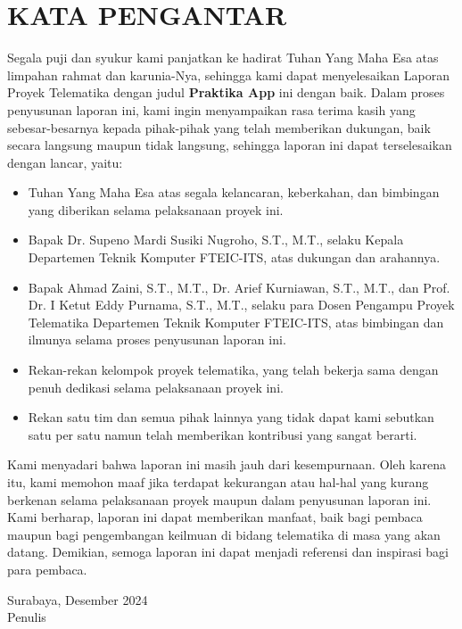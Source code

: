 \chapter*{KATA PENGANTAR}

Segala puji dan syukur kami panjatkan ke hadirat Tuhan Yang Maha Esa atas limpahan rahmat dan karunia-Nya, sehingga kami dapat menyelesaikan Laporan Proyek Telematika dengan judul \textbf{Praktika App} ini dengan baik. Dalam proses penyusunan laporan ini, kami ingin menyampaikan rasa terima kasih yang sebesar-besarnya kepada pihak-pihak yang telah memberikan dukungan, baik secara langsung maupun tidak langsung, sehingga laporan ini dapat terselesaikan dengan lancar, yaitu:

\begin{itemize}[leftmargin=2cm]
    \item Tuhan Yang Maha Esa atas segala kelancaran, keberkahan, dan bimbingan yang diberikan selama pelaksanaan proyek ini.
    \item Bapak Dr. Supeno Mardi Susiki Nugroho, S.T., M.T., selaku Kepala Departemen Teknik Komputer FTEIC-ITS, atas dukungan dan arahannya.
    \item Bapak Ahmad Zaini, S.T., M.T., Dr. Arief Kurniawan, S.T., M.T., dan Prof. Dr. I Ketut Eddy Purnama, S.T., M.T., selaku para Dosen Pengampu Proyek Telematika Departemen Teknik Komputer FTEIC-ITS, atas bimbingan dan ilmunya selama proses penyusunan laporan ini.
    \item Rekan-rekan kelompok proyek telematika, yang telah bekerja sama dengan penuh dedikasi selama pelaksanaan proyek ini.
    \item Rekan satu tim dan semua pihak lainnya yang tidak dapat kami sebutkan satu per satu namun telah memberikan kontribusi yang sangat berarti.
\end{itemize}

Kami menyadari bahwa laporan ini masih jauh dari kesempurnaan. Oleh karena itu, kami memohon maaf jika terdapat kekurangan atau hal-hal yang kurang berkenan selama pelaksanaan proyek maupun dalam penyusunan laporan ini. Kami berharap, laporan ini dapat memberikan manfaat, baik bagi pembaca maupun bagi pengembangan keilmuan di bidang telematika di masa yang akan datang. Demikian, semoga laporan ini dapat menjadi referensi dan inspirasi bagi para pembaca.

\vspace{1cm}

\begin{flushright}
Surabaya, Desember 2024 \\
\vspace{4cm}
Penulis
\end{flushright}
